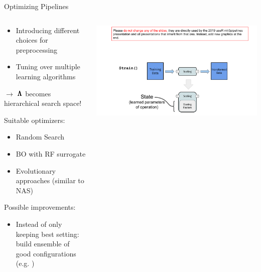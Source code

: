 \begin{frame}{Optimizing Pipelines}

  \begin{columns}
    \begin{column}{0.5\textwidth}
      \vspace*{-0.5em}
      \begin{itemize}
        \item Introducing different choices for preprocessing
        \item Tuning over multiple learning algorithms
      \end{itemize}
      $\rightarrow$ $\pmb{\Lambda}$ becomes hierarchical search space!
      
      \vspace*{0.5em}

      Suitable optimizers:
      \begin{itemize}
        \item Random Search
        \item BO with RF surrogate
        \item Evolutionary approaches (similar to NAS)
      \end{itemize}

      Possible improvements:
      \begin{itemize}
        \item Instead of only keeping best setting: build ensemble of good configurations (e.g. )
      \end{itemize}
    \end{column}%
    \begin{column}{0.5\textwidth}
      \begin{center}
        \includegraphics[page=7, width=\textwidth, trim=160 0 30 160, clip]{images/mlr3Pipelines_graphics}
      \end{center}
    \end{column}
  \end{columns}
    
\end{frame}

